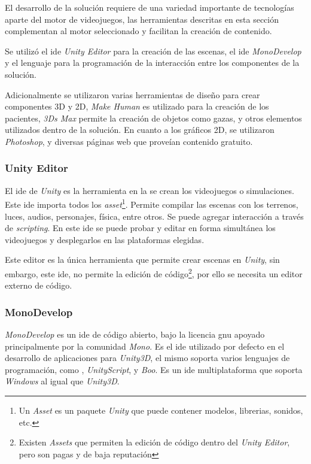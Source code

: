 El desarrollo de la solución requiere de una variedad importante de tecnologías
aparte del motor de videojuegos, las herramientas descritas en esta sección complementan al
motor seleccionado y facilitan la creación de contenido.

Se utilizó el \Gls{ide} \textit{Unity Editor} para la creación de las escenas,
el \Gls{ide} \textit{MonoDevelop} y el lenguaje \cs{} para la programación de la
interacción entre los componentes de la solución.

Adicionalmente se utilizaron varias herramientas de diseño para crear
componentes 3D y 2D, \textit{Make Human} es utilizado para la creación de los
pacientes, \textit{3Ds Max} permite la creación de objetos como gazas, y otros
elementos utilizados dentro de la solución. En cuanto a los gráficos 2D, se
utilizaron \textit{Photoshop}, y diversas páginas web que proveían contenido
gratuito.

\subsubsection{Unity Editor}

El \Gls{ide} de \textit{Unity} es la herramienta en la se crean los videojuegos
o simulaciones. Este \Gls{ide} importa todos los \textit{asset}\footnote{Un
    \textit{Asset} es un paquete \textit{Unity} que puede contener modelos,
    librerias, sonidos, etc.}. Permite compilar las escenas con los terrenos,
luces, audios, personajes, física, entre otros. Se puede agregar interacción a
través de \textit{scripting}. En este \Gls{ide} se puede probar y editar en
forma simultánea los videojuegos y desplegarlos en las plataformas
elegidas\cite{unity3d}. 

Este editor es la única herramienta que permite crear escenas en \textit{Unity},
sin embargo, este \Gls{ide}, no permite la edición de código\footnote{Existen
    \textit{Assets} que permiten la edición de código dentro del \textit{Unity
        Editor}, pero son pagas y de baja reputación}, por ello se necesita un
editor externo de código.


\subsubsection{MonoDevelop}

\textit{MonoDevelop} es un \Gls{ide} de código abierto, bajo la licencia
\Gls{gnu} apoyado principalmente por la comunidad \textit{Mono}. Es el \Gls{ide}
utilizado por defecto en el desarrollo de aplicaciones para \textit{Unity3D}, el
mismo soporta varios lenguajes de programación, como \cs{},
\textit{UnityScript}, y \textit{Boo}. Es un \Gls{ide} multiplataforma que
soporta \textit{Windows} al igual que \textit{Unity3D}.

